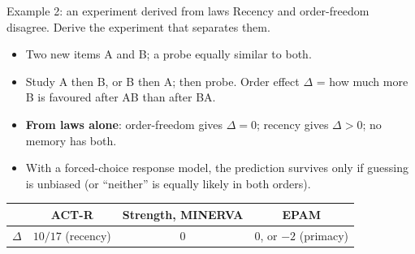 \documentclass[aspectratio=169,11pt]{beamer}
\begin{document}
\begin{frame}{Example 2: an experiment derived from laws}
  Recency and order-freedom disagree. Derive the experiment that separates them.
  \medskip
  \begin{itemize}\small
    \item Two new items A and B; a probe equally similar to both.
    \item Study A then B, or B then A; then probe. Order effect $\Delta$ = how much more B is favoured after AB than after BA.
    \item \textbf{From laws alone}: order-freedom gives $\Delta = 0$; recency gives $\Delta > 0$; no memory has both.
    \item With a forced-choice response model, the prediction survives only if guessing is unbiased (or ``neither'' is equally likely in both orders).
  \end{itemize}
  \medskip
  \small
  \begin{tabular}{lccc}
    \toprule
    & ACT-R & Strength, MINERVA & EPAM\\
    \midrule
    $\Delta$ & $10/17$ (recency) & $0$ & $0$, or $-2$ (primacy)\\
    \bottomrule
  \end{tabular}
\end{frame}
\end{document}
